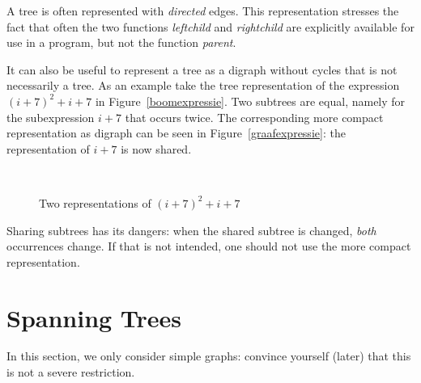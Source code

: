 A tree is often represented with {\em directed} edges. This
representation stresses the fact that often the two functions {\em
leftchild} and {\em rightchild} are explicitly available for use in a
program, but not the function {\em parent}.

It can also be useful to represent a tree as a digraph without cycles
that is not necessarily a tree. As an example take the tree
representation of the expression $(i+7)^{2} + i + 7$ in
Figure~\ref{boomexpressie}. Two subtrees are equal, namely for the
subexpression $i+7$ that occurs twice. The corresponding more compact
representation as digraph can be seen in Figure~\ref{graafexpressie}:
the representation of $i+7$ is now shared.

\begin{figure}[ht]
\mbox{
\hspace{0.5cm}
\hspace{1cm}
}
\caption{Two representations of $(i+7)^{2} + i + 7$}
\end{figure}

Sharing subtrees has its dangers: when the shared subtree is changed,
{\em both} occurrences change. If that is not intended, one should not
use the more compact representation.

\section{Spanning Trees}

In this section, we only consider simple graphs: convince yourself
(later) that this is not a severe restriction.

